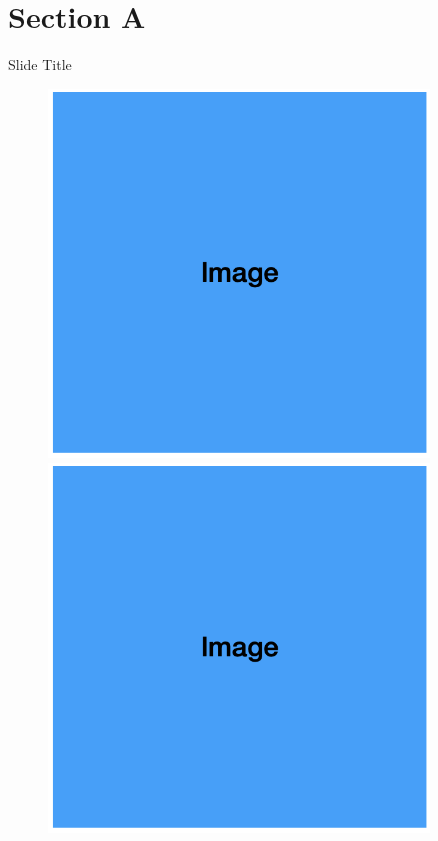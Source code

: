\documentclass[8pt, aspectratio=169]{beamer} %
\begin{document}
\section{Section A}
\begin{frame}{Slide Title}
    \begin{figure}
      \centering
      \begin{minipage}[b]{0.3\textwidth}
        \centering
        \includegraphics[width=0.9\textwidth]{assets/placeholder_img.png}
      \end{minipage}
      \hfill
      \begin{minipage}[b]{0.3\textwidth}
        \centering
        \includegraphics[width=0.9\textwidth]{assets/placeholder_img.png}

\end{minipage}
\end{figure}
\end{frame}
\end{document}
